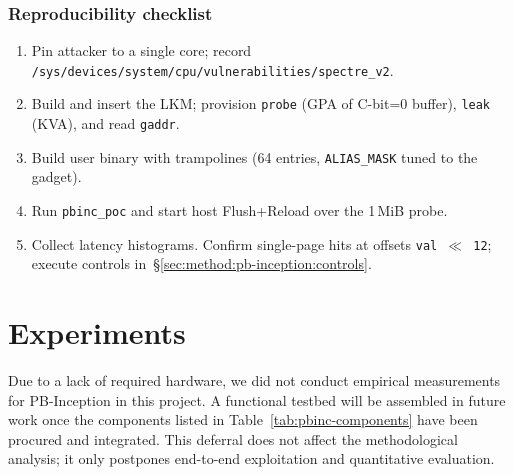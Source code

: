 \documentclass[11pt,a4paper]{article}
\begin{document}
\subsubsection{Reproducibility checklist}
\label{sec:method:pb-inception:repro}
\begin{enumerate}
  \item Pin attacker to a single core; record \texttt{/sys/devices/system/cpu/vulnerabilities/spectre\_v2}.
  \item Build and insert the LKM; provision \texttt{probe} (GPA of C-bit=0 buffer), \texttt{leak} (KVA), and read \texttt{gaddr}.
  \item Build user binary with trampolines (64 entries, \texttt{ALIAS\_MASK} tuned to the gadget).
  \item Run \texttt{pbinc\_poc} and start host Flush+Reload over the 1\,MiB probe.
  \item Collect latency histograms. Confirm single-page hits at offsets \texttt{val\,$\ll$\,12}; execute controls in~\S\ref{sec:method:pb-inception:controls}.
\end{enumerate}

\section{Experiments}
Due to a lack of required hardware, we did not conduct empirical measurements for PB-Inception in this project. A functional testbed will be assembled in future work once the components listed in Table~\ref{tab:pbinc-components} have been procured and integrated. This deferral does not affect the methodological analysis; it only postpones end-to-end exploitation and quantitative evaluation.
\clearpage
\end{document}
